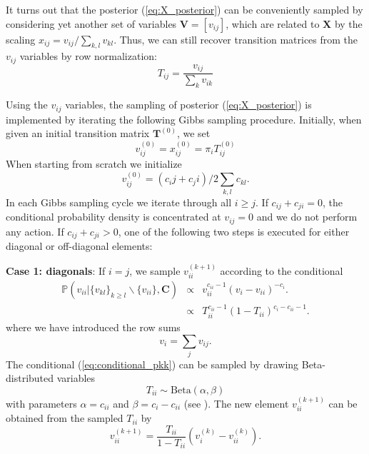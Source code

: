 \documentclass[aps,pre,twocolumn,superscriptaddress,nofootinbib,longbibliography]{revtex4-1}
\begin{document}
{It turns out that the posterior (\ref{eq:X_posterior}) can be conveniently sampled by considering yet another set of
variables $\mathbf{V}=[v_{ij}]$, which are related to $\mathbf{X}$ by the scaling $x_{ij} = v_{ij} / \sum_{k,l} v_{kl}$. Thus, we can still recover 
transition matrices from the $v_{ij}$ variables by row normalization:
\begin{equation}
  \label{eq:T_from_V}
  T_{ij} = \frac{v_{ij}}{\sum_k v_{ik}}
\end{equation}

Using the $v_{ij}$ variables, the sampling of posterior (\ref{eq:X_posterior}) is implemented by iterating the following Gibbs sampling
procedure. Initially, when given an initial transition matrix $\mathbf{T}^{(0)}$, we set 
\begin{equation} 
	v_{ij}^{(0)} = x_{ij}^{(0)} = \pi_{i} T_{ij}^{(0)}
\end{equation} 
When starting from scratch we initialize 
\begin{equation} 
	v_{ij}^{(0)} = (c_ij + c_ji) / 2 \sum_{k,l} c_{kl}.
\end{equation} 
In each Gibbs sampling cycle we iterate through all $i \ge j$. If $c_{ij} + c_{ji} = 0$, the conditional probability density is concentrated at
$v_{ij} = 0$ and we do not perform any action. If  $c_{ij} + c_{ji} > 0$, one of the following two steps is executed for either diagonal or off-diagonal
elements:

{\bf Case 1: diagonals}: If $i = j$, we sample $v_{ii}^{(k+1)}$ according to the conditional
\begin{eqnarray}
  \mathbb{P}(v_{ii} | \{v_{kl}\}_{k \geq l} \backslash \{v_{ii}\}, \mathbf{C}) 
							& \propto & v_{ii}^{c_{ii}-1} (v_i - v_{ii})^{-c_{i}}. \\
							& \propto & T_{ii}^{c_{ii}-1} (1 - T_{ii})^{c_{i}-c_{ii}-1}.
  \label{eq:conditional_pkk}
\end{eqnarray}
where we have introduced the row sums
\begin{equation}
   v_i = \sum_j v_{ij}.
\end{equation}
The conditional (\ref{eq:conditional_pkk}) can be sampled by drawing Beta-distributed variables 
\begin{equation}
	T_{ii}\sim \mathrm{Beta}(\alpha,\beta)
	\label{eq:betadist}
\end{equation}
with parameters
$\alpha=c_{ii}$ and $\beta=c_{i}-c_{ii}$ (see \cite{Devroye_Springer86_NonuniformRandom}). The new element $v_{ii}^{(k+1)}$
can be obtained from the sampled $T_{ii}$ by
\begin{equation}
  v_{ii}^{(k+1)}=\frac{T_{ii}}{1-T_{ii}} (v_i^{(k)} - v_{ii}^{(k)}).
  \label{eq:diagonal_transformation}
\end{equation}

}
\end{document}
